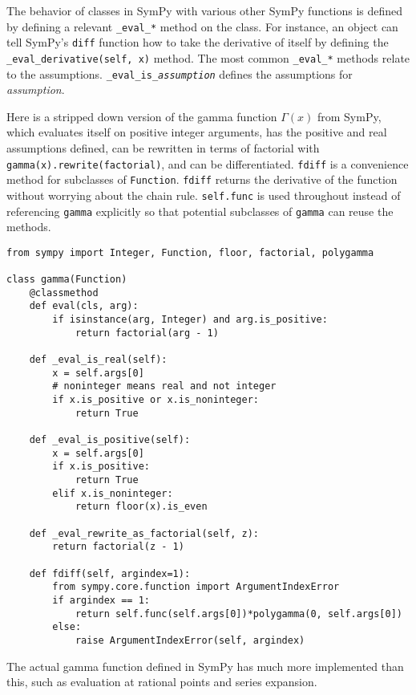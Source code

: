 The behavior of classes in SymPy with various other SymPy functions is defined
by defining a relevant \verb|_eval_|\texttt{\textit{*}} method on the class. For instance, an
object can tell SymPy's \texttt{diff} function how to take the derivative of
itself by defining the \verb|_eval_derivative(self, x)| method. The most
common \verb|_eval_|\texttt{\textit{*}} methods relate to the assumptions.
\verb|_eval_is_|\texttt{\textit{assumption}} defines the assumptions for
\textit{assumption}.

Here is a stripped down version of the gamma function $\Gamma(x)$ from SymPy,
which evaluates itself on positive integer arguments, has the positive and
real assumptions defined, can be rewritten in terms of factorial with
\verb|gamma(x).rewrite(factorial)|, and can be differentiated.
\texttt{fdiff} is a convenience method for subclasses of \texttt{Function}.
\texttt{fdiff} returns the derivative of the function without worrying about
the chain rule. \texttt{self.func} is used throughout instead of referencing
\texttt{gamma} explicitly so that potential subclasses of \texttt{gamma} can
reuse the methods.

\begin{verbatim}
from sympy import Integer, Function, floor, factorial, polygamma

class gamma(Function)
    @classmethod
    def eval(cls, arg):
        if isinstance(arg, Integer) and arg.is_positive:
            return factorial(arg - 1)

    def _eval_is_real(self):
        x = self.args[0]
        # noninteger means real and not integer
        if x.is_positive or x.is_noninteger:
            return True

    def _eval_is_positive(self):
        x = self.args[0]
        if x.is_positive:
            return True
        elif x.is_noninteger:
            return floor(x).is_even

    def _eval_rewrite_as_factorial(self, z):
        return factorial(z - 1)

    def fdiff(self, argindex=1):
        from sympy.core.function import ArgumentIndexError
        if argindex == 1:
            return self.func(self.args[0])*polygamma(0, self.args[0])
        else:
            raise ArgumentIndexError(self, argindex)
\end{verbatim}

The actual gamma function defined in SymPy has much more implemented than
this, such as evaluation at rational points and series expansion.
